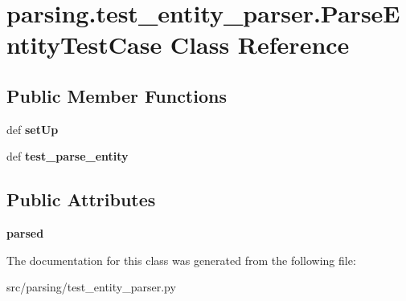 \hypertarget{classparsing_1_1test__entity__parser_1_1_parse_entity_test_case}{\section{parsing.\-test\-\_\-entity\-\_\-parser.\-Parse\-Entity\-Test\-Case \-Class \-Reference}
\label{classparsing_1_1test__entity__parser_1_1_parse_entity_test_case}
}
\subsection*{\-Public \-Member \-Functions}
\begin{DoxyCompactItemize}
\item 
\hypertarget{classparsing_1_1test__entity__parser_1_1_parse_entity_test_case_a3aef2bbafb8cc57dddb47ecd853e9997}{def {\bfseries set\-Up}}\label{classparsing_1_1test__entity__parser_1_1_parse_entity_test_case_a3aef2bbafb8cc57dddb47ecd853e9997}

\item 
\hypertarget{classparsing_1_1test__entity__parser_1_1_parse_entity_test_case_a85e46d800d3bea65ba945ab5dee7c88d}{def {\bfseries test\-\_\-parse\-\_\-entity}}\label{classparsing_1_1test__entity__parser_1_1_parse_entity_test_case_a85e46d800d3bea65ba945ab5dee7c88d}

\end{DoxyCompactItemize}
\subsection*{\-Public \-Attributes}
\begin{DoxyCompactItemize}
\item 
\hypertarget{classparsing_1_1test__entity__parser_1_1_parse_entity_test_case_a2b0ca0158501fa21a821c6e98e86b258}{{\bfseries parsed}}\label{classparsing_1_1test__entity__parser_1_1_parse_entity_test_case_a2b0ca0158501fa21a821c6e98e86b258}

\end{DoxyCompactItemize}


\-The documentation for this class was generated from the following file\-:\begin{DoxyCompactItemize}
\item 
src/parsing/test\-\_\-entity\-\_\-parser.\-py\end{DoxyCompactItemize}
